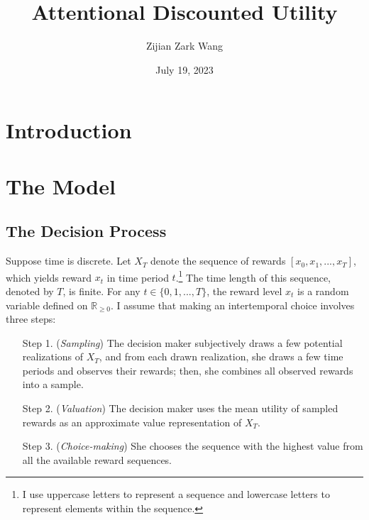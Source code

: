 \documentclass[
  12pt,
]{article}
\title{Attentional Discounted Utility}
\author{Zijian Zark Wang}
\date{July 19, 2023}
\begin{document}
\maketitle

\hypertarget{introduction}{%
\section{Introduction}\label{introduction}}

\hypertarget{the-model}{%
\section{The Model}\label{the-model}}

\hypertarget{the-decision-process}{%
\subsection{The Decision Process}\label{the-decision-process}}

Suppose time is discrete. Let \(X_T\) denote the sequence of rewards
\([x_0,x_1,...,x_T]\), which yields reward \(x_t\) in time period
\(t\).\footnote{I use uppercase letters to represent a sequence and
  lowercase letters to represent elements within the sequence.} The time
length of this sequence, denoted by \(T\), is finite. For any
\(t \in \{0,1,...,T\}\), the reward level \(x_t\) is a random variable
defined on \(\mathbb{R}_{\geq 0}\). I assume that making an
intertemporal choice involves three steps:

\begin{itemize}[leftmargin=2cm]
\item[Step 1.] (\textit{Sampling}) The decision maker subjectively draws a few potential realizations of $X_T$, and from each drawn realization, she draws a few time periods and observes their rewards; then, she combines all observed rewards into a sample.

\item[Step 2.] (\textit{Valuation}) The decision maker uses the mean utility of sampled rewards as an approximate value representation of $X_T$.

\item[Step 3.] (\textit{Choice-making}) She chooses the sequence with the highest value from all the available reward sequences.
\end{itemize}
\end{document}
